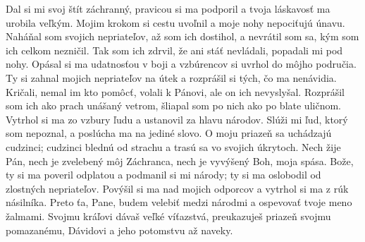 Dal si mi svoj štít záchranný,
pravicou si ma podporil
a tvoja láskavosť ma urobila veľkým.
\versseparator
Mojim krokom si cestu uvoľnil
a moje nohy nepociťujú únavu.
\versseparator
Naháňal som svojich nepriateľov, až som ich dostihol,
a nevrátil som sa, kým som ich celkom nezničil.
\versseparator
Tak som ich zdrvil, že ani stáť nevládali,
popadali mi pod nohy.
\versseparator
Opásal si ma udatnosťou v boji
a vzbúrencov si uvrhol do môjho područia.
\versseparator
Ty si zahnal mojich nepriateľov na útek
a rozprášil si tých, čo ma nenávidia.
\versseparator
Kričali, nemal im kto pomôcť,
volali k Pánovi, ale on ich nevyslyšal.
\versseparator
Rozprášil som ich ako prach unášaný vetrom,
šliapal som po nich ako po blate uličnom.
\versseparator
Vytrhol si ma zo vzbury ľudu
a ustanovil za hlavu národov.
\versseparator
Slúži mi ľud, ktorý som nepoznal,
a poslúcha ma na jediné slovo.
\versseparator
O moju priazeň sa uchádzajú cudzinci;
cudzinci blednú od strachu
a trasú sa vo svojich úkrytoch.
\versseparator
Nech žije Pán, nech je zvelebený môj Záchranca,
nech je vyvýšený Boh, moja spása.
\versseparator
Bože, ty si ma poveril odplatou
a podmanil si mi národy;
ty si ma oslobodil od zlostných nepriateľov.
\versseparator
Povýšil si ma nad mojich odporcov
a vytrhol si ma z rúk násilníka.
\versseparator
Preto ťa, Pane, budem velebiť medzi národmi
a ospevovať tvoje meno žalmami.
\versseparator
Svojmu kráľovi dávaš veľké víťazstvá,
preukazuješ priazeň svojmu pomazanému,
Dávidovi a jeho potomstvu až naveky.
